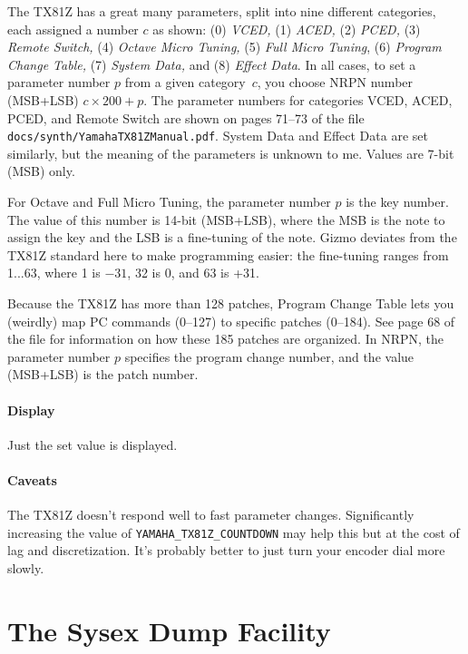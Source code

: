 \documentclass{article}
\begin{document}
The TX81Z has a great many parameters, split into nine different categories, each assigned a number \(c\) as shown:  (0) {\it VCED,} (1) {\it ACED,} (2) {\it PCED,}  (3) {\it Remote Switch,}  (4) {\it Octave Micro Tuning,} (5) {\it Full Micro Tuning},  (6) {\it Program Change Table,} (7) {\it System Data,} and (8) {\it Effect Data}.  In all cases, to set a parameter number \(p\) from a given category~\(c\), you choose NRPN number (MSB+LSB) \(c \times 200 + p\). The parameter numbers for categories VCED, ACED, PCED, and Remote Switch are shown on pages 71--73 of the file \texttt{docs/synth/YamahaTX81ZManual.pdf}.   System Data and Effect Data are set similarly, but the meaning of the parameters is unknown to me.  Values are 7-bit (MSB) only.

For Octave and Full Micro Tuning, the parameter number \(p\) is the key number.  The value of this number is 14-bit (MSB+LSB), where the MSB is the note to assign the key and the LSB is a fine-tuning of the note.  Gizmo deviates from the TX81Z standard here to make programming easier: the fine-tuning ranges from 1...63, where 1 is \(-31\), 32 is 0, and 63 is +31.

Because the TX81Z has more than 128 patches, Program Change Table lets you (weirdly) map PC commands (0--127) to specific patches (0--184).  See page 68 of the file for information on how these 185 patches are organized.  In NRPN, the parameter number \(p\) specifies the program change number, and the value (MSB+LSB) is the patch number.

\paragraph{Display} Just the set value is displayed.

\paragraph{Caveats}  The TX81Z doesn't respond well to fast parameter changes.    Significantly increasing the value of \texttt{YAMAHA\_TX81Z\_COUNTDOWN} may help this but at the cost of lag and discretization.  It's probably better to just turn your encoder dial more slowly.



\clearpage

\section {The Sysex Dump Facility}
\label{sysex}
\end{document}
